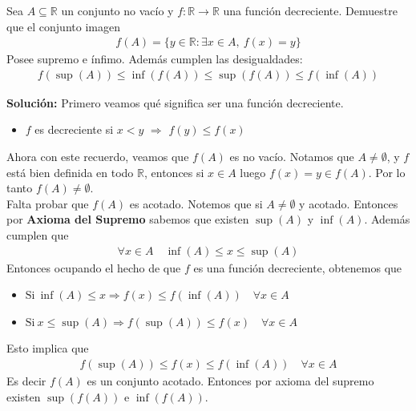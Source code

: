 \documentclass[12pt]{book}
\begin{document}
\begin{prob}{}{}
    Sea $A \subseteq \mathbb{R}$ un conjunto no vacío y $f:\mathbb{R} \to \mathbb{R}$ una función decreciente. Demuestre que el conjunto imagen
    \begin{align*}
        f(A)= \{ y \in \mathbb{R} : \exists x \in A, \ f(x)=y \}
    \end{align*}
    Posee supremo e ínfimo. Además cumplen las desigualdades:
    \begin{align*}
        f(\sup(A))\leq \inf(f(A)) \leq \sup(f(A)) \leq f(\inf(A))
    \end{align*}
\end{prob}
\textbf{Solución:}
Primero veamos qué significa ser una función decreciente. 

\begin{itemize}
    \item $f$ es decreciente si $x< y$ $\Longrightarrow$ $f(y) \leq f(x) $
\end{itemize}
Ahora con este recuerdo, veamos que $f(A)$ es no vacío. Notamos que $A\neq \emptyset$, y $f$ está bien definida en todo $\mathbb{R}$, entonces si $x \in A$ luego $f(x)=y \in f(A)$. Por lo tanto $f(A) \neq \emptyset$. \\

Falta probar que $f(A)$ es acotado. Notemos que si $A\neq \emptyset$ y acotado. Entonces por \textbf{Axioma del Supremo} sabemos que existen $\sup(A)$ y $\inf(A)$. Además cumplen que 
\begin{align*}
    \forall x \in A \quad \inf(A)\leq x \leq \sup(A)
\end{align*}
Entonces ocupando el hecho de que $f$ es una función decreciente, obtenemos que 

\begin{itemize}
    \item $ \text{Si} \ \inf(A) \leq x \Longrightarrow f(x) \leq f(\inf(A)) \quad \forall x \in A$

\item $\text{Si} \ x \leq \sup(A) \Longrightarrow f(\sup(A)) \leq f(x) \quad \forall x \in A$
\end{itemize}
Esto implica que 
\begin{align*}
    f(\sup(A)) \leq f(x) \leq f(\inf(A)) \quad \forall x \in A
\end{align*}
Es decir $f(A)$ es un conjunto acotado. Entonces por axioma del supremo existen $\sup(f(A))$ e $\inf(f(A))$. \\
\end{document}
